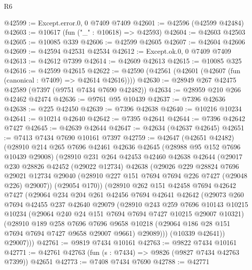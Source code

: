 \begin{lexlean}{R6}
\begin{coremodule}
@42599 := Except.error.{0, 0} @7409 @7409
@42601 := @42596 (@42599 @42484)
@42603 := @10617 (fun ("_" : @10618) => @42593)
@42604 := @42603 @42503
@42605 := @10085 @339
@42606 := @42599 @42605
@42607 := @42604 @42606
@42609 := @42594 @42531 @42534
@42612 := Except.ok.{0, 0} @7409 @7409
@42613 := @42612 @7399
@42614 := @42609 @42613
@42615 := @10085 @325
@42616 := @42599 @42615
@42622 := @42590 (@42561 (@42601 (@42607 (fun (canonical : @7409) => @42614 @42616))))
@42630 := @28949 @267 @42475 @42589 (@7397 (@9751 @7434 @7690 @42482))
@42634 := @28959 @210 @266 @42462 @42474
@42636 := @9761 @95 @10439
@42637 := @7396 @42636
@42638 := @225 @42450
@42639 := @7396 @42638
@42640 := @10216 @10234
@42641 := @10214 @42640
@42642 := @7395 @42641
@42644 := @7396 @42642 @7427
@42645 := @42639 @42644
@42647 := @42634 (@42637 @42645)
@42651 := @7413 @7434 @7690 @10161 @7397
@42759 := @42647
    (@42651 @42482)
    (@28910
      @214
      @265
      @7696
      @42461
      @42636
      @42645
      (@28988 @95 @152 @7696 @10439 @29008)
      (@28910
        @231
        @264
        @42453
        @42460
        @42638
        @42644
        (@29017
          @230
          @28826
          @42452
          (@29022 @12734)
          @42638
          (@29026
            @229
            @28824
            @7696
            @29021
            @12734
            @29040
            (@28910 @227 @151 @7694 @7694 @226 @7427 (@29048 @226) @29007))
          (@29054 @170))
        (@28910
          @262
          @151
          @42458
          @7694
          @42642
          @7427
          (@29064
            @234
            @204
            @261
            @42456
            @7694
            @42641
            @42642
            (@29073
              @260
              @7694
              @42455
              @237
              @42640
              @29079
              (@28910
                @243
                @259
                @7696
                @10143
                @10215
                @10234
                (@29064 @240 @24 @151 @7694 @7694 @7427 @10215 @29007 @10321)
                (@28910
                  @189
                  @258
                  @7696
                  @7696
                  @9658
                  @10218
                  (@29064 @186 @28 @151 @7694 @7694 @7427 @9658 @29007 @9661)
                  @29089)))
            (@10339 @42641))
          @29007)))
@42761 := @9819 @7434 @10161
@42763 := @9822 @7434 @10161
@42771 := @42761 @42763 (fun (s : @7434) => @9826 (@9827 @7434 @42763 @7399)) @42651
@42773 := @7408 @7434 @7690
@42788 := @42771

\end{coremodule}
\end{lexlean}
